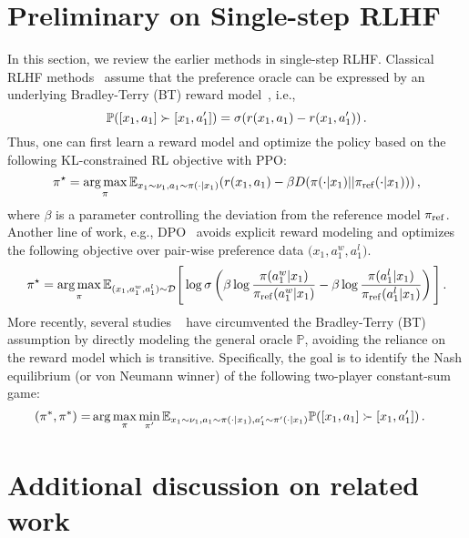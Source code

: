 \section{Preliminary on Single-step RLHF}
\label{prelimi:singlestep}
In this section, we review the earlier methods in single-step RLHF. Classical RLHF methods~\citep{ziegler2019fine,ouyang2022training} assume that the preference oracle can be expressed by an underlying Bradley-Terry (BT) reward model~\citep{bradley1952rank}, i.e., 
$$\mathbb{P}([x_1,a_1]\succ [x_1,a_1']) = \sigma(r(x_1,a_1)-r(x_1,a_1'))\,.$$ Thus, one can first learn a reward model and optimize the policy based on the following KL-constrained RL objective with PPO:
$$
\pi^\star = \operatorname*{arg\,max}_{\pi} \mathbb{E}
_{x_1 \sim \nu_1,a_1 \sim \pi(\cdot|x_1)}
(r(x_1,a_1) -\beta D(\pi(\cdot|x_1) || 
\pi_{\rm ref}
(\cdot|x_1)) )\,,
$$
where $\beta$ is a parameter controlling the deviation from the reference model $\pi_{\rm ref}$. Another line of work, e.g., DPO~\citep{rafailov2023direct} avoids explicit reward modeling and optimizes the following objective over pair-wise preference data ${(x_1,a_1^w,a_1^l})$.
$$
\pi^\star = \operatorname*{arg\,max}_{\pi} \mathbb{E}
_{(x_1,a_1^w,a_1^l) \sim \mathcal{D} }
\Bigg[\log \sigma \left(\beta \log\frac{\pi (a_1^w|x_1)}{\pi_{\rm ref}(a_1^w|x_1)} -
\beta \log\frac{\pi (a_1^l|x_1)}{\pi_{\rm ref}(a_1^l|x_1)} 
\right)
\Bigg]\,.
$$
More recently, several studies ~\citep{swamyminimaximalist,munos2024nash,wu2024self,zhang2024iterative,rosset2024direct} have circumvented the Bradley-Terry (BT) assumption by directly modeling the general oracle $\mathbb{P}$, avoiding the reliance on the reward model which is transitive. Specifically, the goal is to identify the Nash equilibrium (or von Neumann winner) of the following two-player constant-sum game:
\begin{equation*}
\begin{split}
     (\pi^*, \pi^*)
    = &
    \arg \max_{\pi}\min_{\pi'}
    \mathbb{E}_{x_1 \sim \nu_1,a_1 \sim \pi(\cdot|x_1),a_1^\prime \sim \pi^\prime(\cdot|x_1)}
     \mathbb{P}([x_1,a_1] \succ [x_1,a_1^\prime])\,.
\end{split}
\end{equation*}




\section{Additional discussion on related work}
\label{sec:additional_relatedwork}
